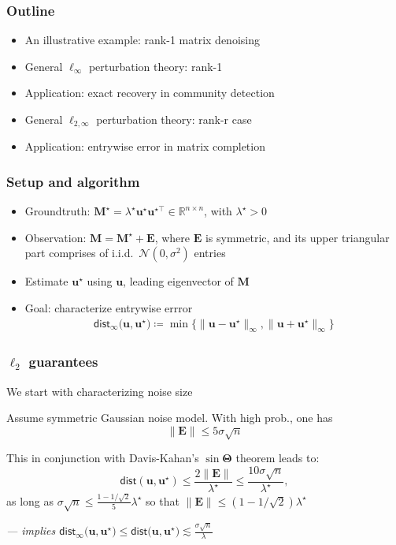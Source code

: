 \documentclass[compress,
mathserif,wide,%
]{beamer}
\begin{document}
\begin{frame}
\frametitle{Outline}

\begin{itemize}
  \itemsep1em
  \item An illustrative example: rank-1 matrix denoising
  \item General $\ell_{\infty}$ perturbation theory: rank-1
  \item Application: exact recovery in community detection
  \item General $\ell_{2,\infty}$ perturbation theory: rank-r case
  \item Application: entrywise error in matrix completion
\end{itemize}

\end{frame}





\begin{frame}
	\frametitle{Setup and algorithm}
	
	\begin{itemize}
		\itemsep 0.5em
		\item Groundtruth: $\bm{M}^{\star} = \lambda^{\star} \bm{u}^{\star} \bm{u}^{\star\top}\in \mathbb{R}^{n\times n}$, with $\lambda^\star > 0$
		\item Observation: $\bm{M} = \bm{M}^{\star} + \bm{E}$, where $\bm{E}$ is symmetric, and its upper triangular part comprises of i.i.d.~$\mathcal{N}(0, \sigma^2)$ entries
		\item Estimate $\bm{u}^{\star}$ using $\bm{u}$, leading eigenvector of $\bm{M}$
		\item Goal: characterize entrywise errror
		 \begin{align*}
	\mathsf{dist}_{\infty}\big(\bm{u},\bm{u}^{\star}\big)
	\coloneqq \min\big\{ \|\bm{u}-\bm{u}^{\star}\|_{\infty}, \|\bm{u}+\bm{u}^{\star}\|_{\infty} \big\}
\end{align*}
	\end{itemize}


\end{frame}


\begin{frame}
	\frametitle{$\ell_{2}$ guarantees}
	
	We start with characterizing noise size
	 
	\begin{lemma}
	Assume symmetric Gaussian noise model. With high prob., one has
	\[
	\|\bm{E}\| \leq 5 \sigma \sqrt{n}
	\] 
	\end{lemma}
	
	\vfill 
	This in conjunction with Davis-Kahan's $\sin \bm{\Theta}$ theorem leads to: 
	\[
	\mathsf{dist}(\bm{u}, \bm{u}^{\star}) \leq \frac{2\| \bm{E} \|}{ \lambda^\star } \leq \frac{10\sigma \sqrt{n} }{ \lambda^\star},
	\]
	as long as $\sigma \sqrt{n} \leq \frac{1 - 1/\sqrt{2} }{5} \lambda^\star$ so that $\|\bm{E}\| \leq (1 - 1 / \sqrt{2}) \lambda^\star$
	
	\vfill 
	{\hfill \em \footnotesize --- implies $\mathsf{dist}_{\infty}\big(\bm{u},\bm{u}^{\star}\big) \leq \mathsf{dist}\big(\bm{u},\bm{u}^{\star}\big) \lesssim \frac{\sigma \sqrt{n} }{ \lambda }$  }
\end{frame}
\end{document}
